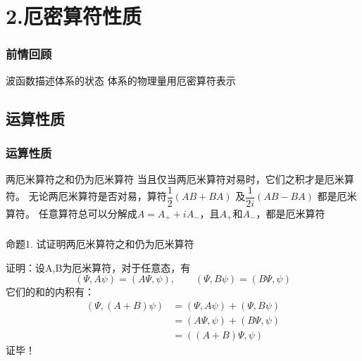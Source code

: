 
\section{2.厄密算符性质}

\begin{frame}
    \frametitle{前情回顾}
    \begin{itemize}
        \Item 波函数描述体系的状态
        \Item 体系的物理量用厄密算符表示
    \end{itemize}
\end{frame} 

\subsection{运算性质}

\begin{frame}
    \frametitle{运算性质}
    \begin{enumerate}
        \Item 两厄米算符之和仍为厄米算符
        \Item 当且仅当两厄米算符对易时，它们之积才是厄米算符。
        \Item 无论两厄米算符是否对易，算符$\dfrac{1}{2}(AB+BA)$ 及$\dfrac{1}{2i}(AB-BA) $  都是厄米算符。
        \Item 任意算符总可以分解成$A=A_+ +iA_-$，且$A_+$和$A_-$，都是厄米算符
    \end{enumerate}
\end{frame} 

\begin{frame} [allowframebreaks=]
    \frametitle{}
    \begin{tcolorbox1}{命题1.}
     试证明两厄米算符之和仍为厄米算符 
    \end{tcolorbox1}
    \alert{证明：}设A,B为厄米算符，对于任意态，有\\
    $$(\Psi, A\psi ) = (A\Psi, \psi), \qquad (\Psi, B\psi ) = (B\Psi, \psi)$$
    它们的和的内积有： \\
    \begin{equation*}
        \begin{split}
            (\Psi, (A+B)\psi ) &= (\Psi, A\psi ) + (\Psi, B\psi ) \\  
            &=(A\Psi, \psi ) + (B\Psi, \psi ) \\
            &=((A+B)\Psi, \psi ) 
         \end{split}
    \end{equation*}  
    证毕！
\end{frame} 

